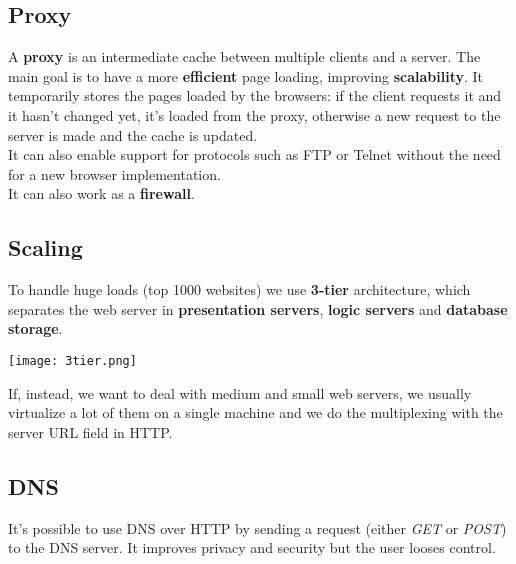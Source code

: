 \subsection{Proxy}
A \textbf{proxy} is an intermediate cache between multiple clients and a server. The main goal is to have a more \textbf{efficient} page loading, improving \textbf{scalability}. It temporarily stores the pages loaded by the browsers: if the client requests it and it hasn't changed yet, it's loaded from the proxy, otherwise a new request to the server is made and the cache is updated.\\
It can also enable support for protocols such as FTP or Telnet without the need for a new browser implementation.\\
It can also work as a \textbf{firewall}. 

\subsection{Scaling}
To handle huge loads (top 1000 websites) we use \textbf{3-tier} architecture, which separates the web server in \textbf{presentation servers}, \textbf{logic servers} and \textbf{database storage}. 
\begin{center}
	\texttt{[image: 3tier.png]}
\end{center}
If, instead, we want to deal with medium and small web servers, we usually virtualize a lot of them on a single machine and we do the multiplexing with the server URL field in HTTP.

\subsection{DNS}
It's possible to use DNS over HTTP by sending a request (either \textit{GET} or \textit{POST}) to the DNS server. It improves privacy and security but the user looses control.